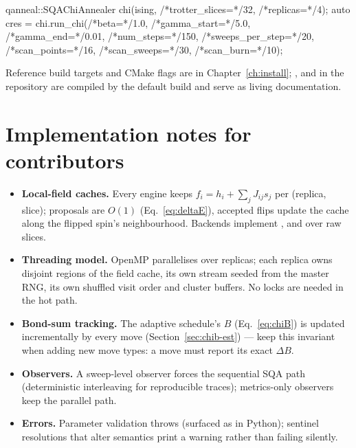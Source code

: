 \begin{cppcode}
qanneal::SQAChiAnnealer chi(ising, /*trotter_slices=*/32, /*replicas=*/4);
auto cres = chi.run_chi(/*beta=*/1.0,
                        /*gamma_start=*/5.0, /*gamma_end=*/0.01,
                        /*num_steps=*/150, /*sweeps_per_step=*/20,
                        /*scan_points=*/16, /*scan_sweeps=*/30,
                        /*scan_burn=*/10);
\end{cppcode}

Reference build targets and CMake flags are in Chapter~\ref{ch:install};
,
 and
 in the repository are compiled by the
default build and serve as living documentation.

\section{Implementation notes for contributors}

\begin{itemize}
\item \textbf{Local-field caches.} Every engine keeps
$f_i=h_i+\sum_jJ_{ij}s_j$ per (replica, slice); proposals are $O(1)$
(Eq.~\eqref{eq:deltaE}), accepted flips update the cache along the flipped
spin's neighbourhood. Backends implement
,  and
 over raw  slices.
\item \textbf{Threading model.} OpenMP parallelises over replicas; each
replica owns disjoint regions of the field cache, its own
 stream seeded from the master RNG, its own shuffled
visit order and cluster buffers. No locks are needed in the hot path.
\item \textbf{Bond-sum tracking.} The adaptive schedule's $B$
(Eq.~\eqref{eq:chiB}) is updated incrementally by every move
(Section~\ref{sec:chib-est}) --- keep this invariant when adding new move
types: a move must report its exact $\Delta B$.
\item \textbf{Observers.} A sweep-level observer forces the sequential SQA
path (deterministic interleaving for reproducible traces); metrics-only
observers keep the parallel path.
\item \textbf{Errors.} Parameter validation throws
 (surfaced as  in Python);
sentinel resolutions that alter semantics print a  warning rather
than failing silently.
\end{itemize}
